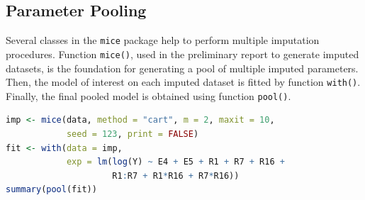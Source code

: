 \documentclass[11pt]{article}
\begin{document}
\subsection{Parameter Pooling}
Several classes in the \texttt{mice} package help to perform multiple imputation procedures. Function \texttt{mice()}, used in the preliminary report to generate imputed datasets, is the foundation for generating a pool of multiple imputed parameters. Then, the model of interest on each imputed dataset is fitted by function \texttt{with()}. Finally, the final pooled model is obtained using function \texttt{pool()}.
\begin{file}[project.r]
\begin{lstlisting}[language = R]
imp <- mice(data, method = "cart", m = 2, maxit = 10,
            seed = 123, print = FALSE)
fit <- with(data = imp, 
            exp = lm(log(Y) ~ E4 + E5 + R1 + R7 + R16 + 
                     R1:R7 + R1*R16 + R7*R16))
summary(pool(fit))
\end{lstlisting}
\end{file}



\end{document}
